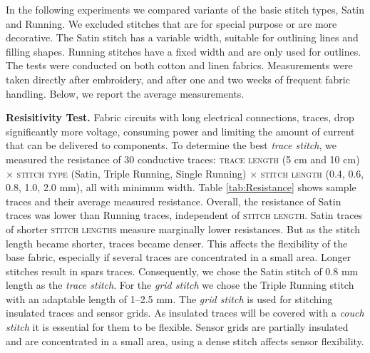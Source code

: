 \documentclass[header.tex]{subfiles}
\begin{document}
In the following experiments we compared variants of the basic stitch types, Satin and Running. We excluded stitches that are for special purpose or are more decorative. The Satin stitch has a variable width, suitable for outlining lines and filling shapes. Running stitches have a fixed width and are only used for outlines. The tests were conducted on both cotton and linen fabrics. Measurements were taken directly after embroidery, and after one and two weeks of frequent fabric handling. Below, we report the average measurements. 





 \textbf{Resisitivity Test.} Fabric circuits with long electrical connections, traces, drop significantly more voltage, consuming power and limiting the amount of current that can be delivered to components. To determine the best \textit{trace stitch}, we measured the resistance of 30 conductive traces: \textsc{trace length} (5 cm and 10 cm) $\times$ \textsc{stitch type} (Satin, Triple Running, Single Running) $\times$ \textsc{stitch length} (0.4, 0.6, 0.8, 1.0, 2.0 mm), all with minimum width. Table \ref{tab:Resistance} shows sample traces and their average measured resistance. Overall, the resistance of Satin traces was lower than Running traces, independent of \textsc{stitch length}. Satin traces of shorter \textsc{stitch lengths} measure marginally lower resistances. But as the stitch length became shorter, traces became denser. This affects the flexibility of the base fabric, especially if several traces are concentrated in a small area. Longer stitches result in spars traces. Consequently, we chose the Satin stitch of 0.8 mm length as the \textit{trace stitch}. For the \textit{grid stitch} we chose the Triple Running stitch with an adaptable length of 1--2.5 mm. The \textit{grid stitch} is used for stitching insulated traces and sensor grids. As insulated traces will be covered with a \textit{couch stitch} it is essential for them to be flexible. Sensor grids are partially insulated and are concentrated in a small area, using a dense stitch affects sensor flexibility.
\end{document}
